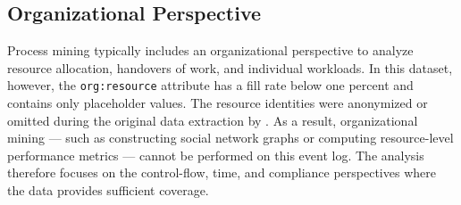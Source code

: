 \subsection{Organizational Perspective}
\label{sub:organizational}

Process mining typically includes an organizational perspective to analyze resource allocation, handovers of work, and individual workloads. In this dataset, however, the \texttt{org:resource} attribute has a fill rate below one percent and contains only placeholder values. The resource identities were anonymized or omitted during the original data extraction by \textcite{deleoni2015}. As a result, organizational mining — such as constructing social network graphs or computing resource-level performance metrics — cannot be performed on this event log. The analysis therefore focuses on the control-flow, time, and compliance perspectives where the data provides sufficient coverage.
